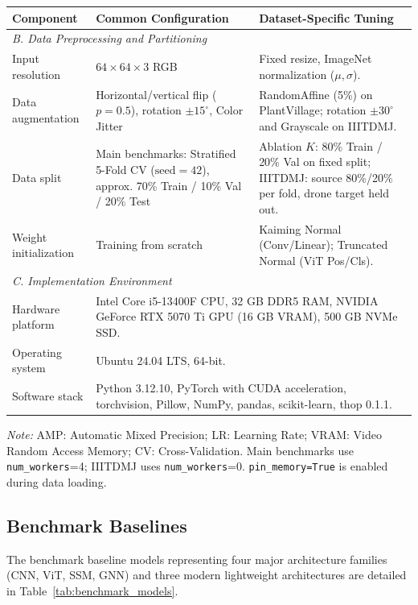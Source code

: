 \documentclass[]{interact}
\theoremstyle{plain}
\theoremstyle{definition}
\theoremstyle{remark}
\begin{document}
{\begin{table}[H]
\addtocounter{table}{-1}
\footnotesize
\setlength{\tabcolsep}{3.5pt}
\renewcommand{\arraystretch}{1.10}
{\begin{tabular}{@{}p{3.1cm}p{5.4cm}p{5.7cm}@{}} \toprule
\textbf{Component} & \textbf{Common Configuration} & \textbf{Dataset-Specific Tuning} \\ \midrule
\multicolumn{3}{l}{\textit{B. Data Preprocessing and Partitioning}} \\ \midrule
Input resolution & $64 \times 64 \times 3$ RGB & Fixed resize, ImageNet normalization ($\mu, \sigma$). \\
Data augmentation & Horizontal/vertical flip ($p=0.5$), rotation $\pm 15^\circ$, Color Jitter & RandomAffine (5\%) on PlantVillage; rotation $\pm 30^\circ$ and Grayscale on IIITDMJ. \\
Data split & Main benchmarks: Stratified 5-Fold CV ($\text{seed}=42$), approx. 70\% Train / 10\% Val / 20\% Test & Ablation $K$: 80\% Train / 20\% Val on fixed split; IIITDMJ: source 80\%/20\% per fold, drone target held out. \\
Weight initialization & Training from scratch & Kaiming Normal (Conv/Linear); Truncated Normal (ViT Pos/Cls). \\ \midrule
\multicolumn{3}{l}{\textit{C. Implementation Environment}} \\ \midrule
Hardware platform & \multicolumn{2}{p{11.1cm}}{Intel Core i5-13400F CPU, 32 GB DDR5 RAM, NVIDIA GeForce RTX 5070 Ti GPU (16 GB VRAM), 500 GB NVMe SSD.} \\
Operating system & \multicolumn{2}{p{11.1cm}}{Ubuntu 24.04 LTS, 64-bit.} \\
Software stack & \multicolumn{2}{p{11.1cm}}{Python 3.12.10, PyTorch with CUDA acceleration, torchvision, Pillow, NumPy, pandas, scikit-learn, thop 0.1.1.} \\ \bottomrule
\end{tabular}}
\label{tab:training_protocol}
\parbox{\textwidth}{\vspace{2pt}\footnotesize\textit{Note:} AMP: Automatic Mixed Precision; LR: Learning Rate; VRAM: Video Random Access Memory; CV: Cross-Validation. Main benchmarks use \texttt{num\_workers}=4; IIITDMJ uses \texttt{num\_workers}=0. \texttt{pin\_memory=True} is enabled during data loading.}
\end{table}

\subsection{Benchmark Baselines}
The benchmark baseline models representing four major architecture families (CNN, ViT, SSM, GNN) and three modern lightweight architectures are detailed in Table~\ref{tab:benchmark_models}.

}
\end{document}
